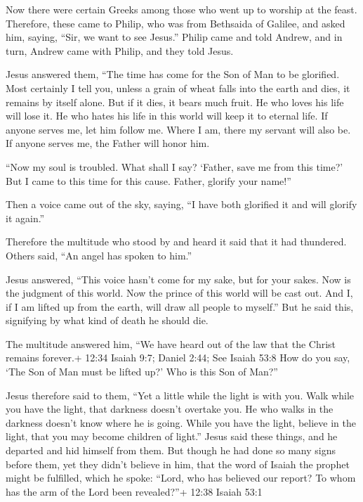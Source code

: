  Now there were certain Greeks among those who went up to
worship at the feast.  Therefore, these came to Philip, who
was from Bethsaida of Galilee, and asked him, saying, ``Sir, we want to
see Jesus.''  Philip came and told Andrew, and in turn,
Andrew came with Philip, and they told Jesus.

 Jesus answered them, ``The time has come for the Son of
Man to be glorified.  Most certainly I tell you, unless a
grain of wheat falls into the earth and dies, it remains by itself
alone. But if it dies, it bears much fruit.  He who loves
his life will lose it. He who hates his life in this world will keep it
to eternal life.  If anyone serves me, let him follow me.
Where I am, there my servant will also be. If anyone serves me, the
Father will honor him.

 ``Now my soul is troubled. What shall I say? `Father, save
me from this time?' But I came to this time for this cause.
 Father, glorify your name!''

Then a voice came out of the sky, saying, ``I have both glorified it and
will glorify it again.''

 Therefore the multitude who stood by and heard it said
that it had thundered. Others said, ``An angel has spoken to him.''

 Jesus answered, ``This voice hasn't come for my sake, but
for your sakes.  Now is the judgment of this world. Now the
prince of this world will be cast out.  And I, if I am
lifted up from the earth, will draw all people to myself.''
 But he said this, signifying by what kind of death he
should die.

 The multitude answered him, ``We have heard out of the law
that the Christ remains forever.+ 12:34 Isaiah 9:7; Daniel 2:44; See
Isaiah 53:8 How do you say, `The Son of Man must be lifted up?' Who is
this Son of Man?''

 Jesus therefore said to them, ``Yet a little while the
light is with you. Walk while you have the light, that darkness doesn't
overtake you. He who walks in the darkness doesn't know where he is
going.  While you have the light, believe in the light,
that you may become children of light.'' Jesus said these things, and he
departed and hid himself from them.  But though he had done
so many signs before them, yet they didn't believe in him, 
that the word of Isaiah the prophet might be fulfilled, which he spoke:
``Lord, who has believed our report? To whom has the arm of the Lord
been revealed?''+ 12:38 Isaiah 53:1

